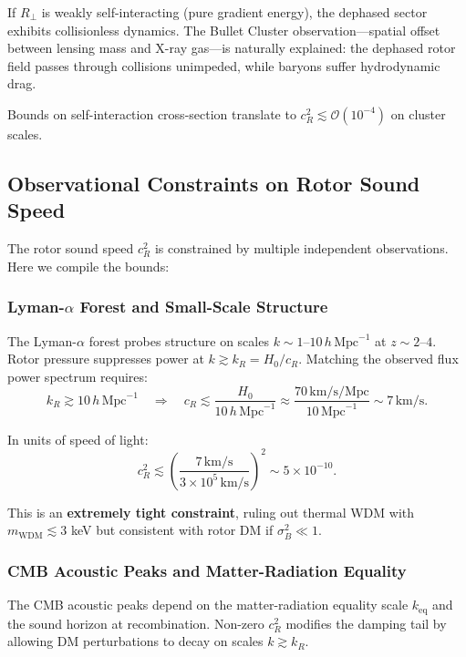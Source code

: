 \documentclass[11pt,a4paper]{article}
\numberwithin{equation}{section}
\theoremstyle{plain}
\theoremstyle{definition}
\theoremstyle{remark}
\begin{document}
If $R_\perp$ is weakly self-interacting (pure gradient energy), the dephased sector exhibits collisionless dynamics. The Bullet Cluster observation---spatial offset between lensing mass and X-ray gas---is naturally explained: the dephased rotor field passes through collisions unimpeded, while baryons suffer hydrodynamic drag.

Bounds on self-interaction cross-section translate to $c_R^2\lesssim \mathcal{O}(10^{-4})$ on cluster scales.

\subsection{Observational Constraints on Rotor Sound Speed}

The rotor sound speed $c_R^2$ is constrained by multiple independent observations. Here we compile the bounds:

\subsubsection{Lyman-$\alpha$ Forest and Small-Scale Structure}

The Lyman-$\alpha$ forest probes structure on scales $k \sim 1$--$10\,h\,\text{Mpc}^{-1}$ at $z\sim 2$--$4$. Rotor pressure suppresses power at $k \gtrsim k_R = H_0/c_R$. Matching the observed flux power spectrum requires:
\begin{equation}
k_R \gtrsim 10\,h\,\text{Mpc}^{-1} \quad\Rightarrow\quad c_R \lesssim \frac{H_0}{10\,h\,\text{Mpc}^{-1}} \approx \frac{70\,\text{km/s/Mpc}}{10\,\text{Mpc}^{-1}} \sim 7\,\text{km/s}.
\end{equation}

In units of speed of light:
\begin{equation}
c_R^2 \lesssim \left(\frac{7\,\text{km/s}}{3\times 10^5\,\text{km/s}}\right)^2 \sim 5 \times 10^{-10}.
\label{eq:lya-constraint}
\end{equation}

This is an \textbf{extremely tight constraint}, ruling out thermal WDM with $m_{\text{WDM}} \lesssim 3$ keV but consistent with rotor DM if $\sigma_B^2 \ll 1$.

\subsubsection{CMB Acoustic Peaks and Matter-Radiation Equality}

The CMB acoustic peaks depend on the matter-radiation equality scale $k_{\text{eq}}$ and the sound horizon at recombination. Non-zero $c_R^2$ modifies the damping tail by allowing DM perturbations to decay on scales $k \gtrsim k_R$.
\end{document}
